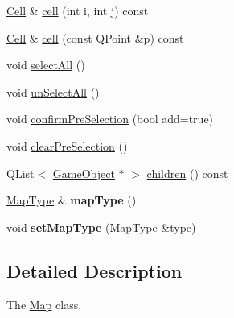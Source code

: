 \begin{DoxyCompactItemize}
\item 
\hyperlink{class_cell}{\-Cell} \& \hyperlink{class_map_a6c94b3e99490efa0f170db132dc9f5b8}{cell} (int i, int j) const 
\item 
\hyperlink{class_cell}{\-Cell} \& \hyperlink{class_map_ae0b03b422a10edbfa7bd0b4bdd085793}{cell} (const \-Q\-Point \&p) const 
\item 
void \hyperlink{class_map_a16aea6b5c9de3a26b094d964885b33b7}{select\-All} ()
\item 
void \hyperlink{class_map_a5b85190575503a09c5c6de012da64f7c}{un\-Select\-All} ()
\item 
void \hyperlink{class_map_a89cab58d82e08dacfe0b97899bab5501}{confirm\-Pre\-Selection} (bool add=true)
\item 
void \hyperlink{class_map_a0a637f44f0a59c3a67b6a507ae710c7f}{clear\-Pre\-Selection} ()
\item 
\-Q\-List$<$ \hyperlink{class_game_object}{\-Game\-Object} $\ast$ $>$ \hyperlink{class_map_a939817aa7f5c9e81d3d2b1a42d9403e7}{children} () const 
\item 
\hypertarget{class_map_a8e1e0668216f05a97d3eb834a3ca4382}{\hyperlink{class_map_type}{\-Map\-Type} \& {\bfseries map\-Type} ()}\label{class_map_a8e1e0668216f05a97d3eb834a3ca4382}

\item 
\hypertarget{class_map_acf0c129e3f2102056823c3b9f5cc3a67}{void {\bfseries set\-Map\-Type} (\hyperlink{class_map_type}{\-Map\-Type} \&type)}\label{class_map_acf0c129e3f2102056823c3b9f5cc3a67}

\end{DoxyCompactItemize}


\subsection{\-Detailed \-Description}
\-The \hyperlink{class_map}{\-Map} class. 

